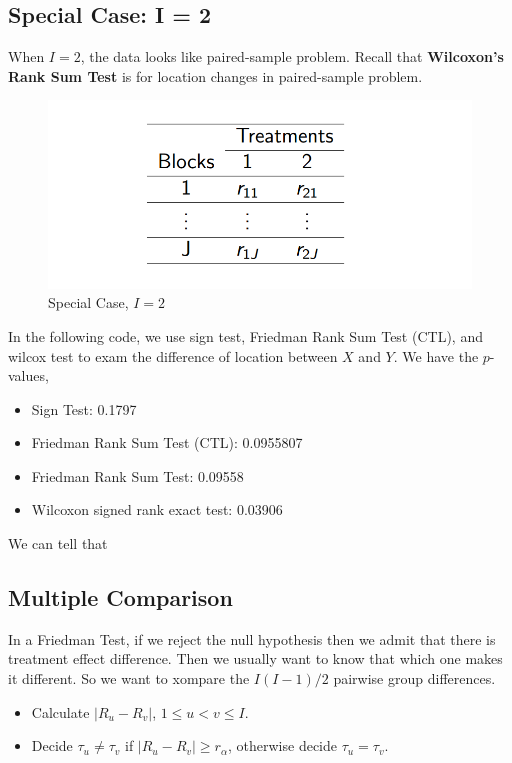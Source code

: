 \subsection{Special Case: I = 2}
When $I = 2$, the data looks like paired-sample problem. Recall that \textbf{Wilcoxon's Rank Sum Test} is for location changes in paired-sample problem.
\begin{figure}[H]
	\centering
	\includegraphics[width=0.7\linewidth]{fig/rank-example-i=2}
	\caption{Special Case, $I = 2$}
	\label{fig:rank-example-i2}
\end{figure}

In the following code, we use sign test, Friedman Rank Sum Test (CTL), and wilcox test to exam the difference of location between $X$ and $Y$. We have the $p$-values,
\begin{itemize}
	\item Sign Test: 0.1797
	\item Friedman Rank Sum Test (CTL): 0.0955807
	\item Friedman Rank Sum Test: 0.09558
	\item Wilcoxon signed rank exact test: 0.03906
\end{itemize}
We can tell that 



\subsection{Multiple Comparison}
In a Friedman Test, if we reject the null hypothesis then we admit that there is treatment effect difference. Then we usually want to know that which one makes it different. So we want to xompare the $I (I - 1) / 2$ pairwise group differences.
\begin{itemize}
	\item Calculate $|R_u - R_v|$, $1 \le u < v \le I$.
	\item Decide $\tau_u \neq \tau_v$ if $|R_u - R_v| \ge r_\alpha$, otherwise decide $\tau_u = \tau_v$.
\end{itemize}



